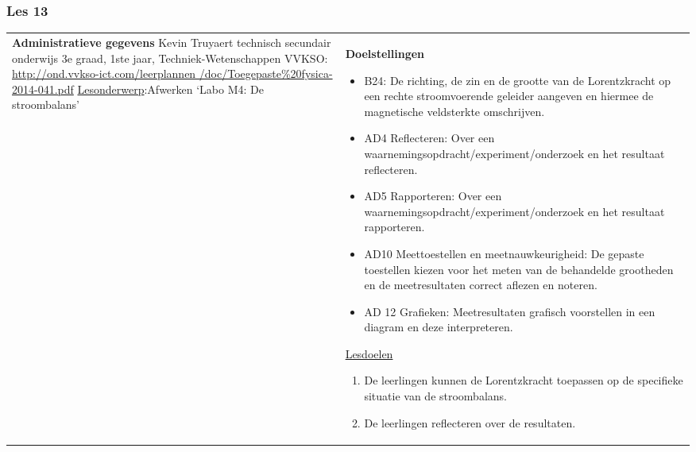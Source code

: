 


\begin{landscape}
	\subsubsection{Les 13}
	\begin{tabularx}{1.56\textwidth}{|p{}|X|}\hline
		\textbf{Administratieve gegevens}\newline\newline
		Kevin Truyaert\newline\newline
		technisch secundair onderwijs\newline
		3e graad, 1ste jaar, Techniek-Wetenschappen\newline
		VVKSO: \href{http://ond.vvkso-ict.com/leerplannen/doc/Toegepaste\%20fysica-2014-041.pdf}{http://ond.vvkso-ict.com/leerplannen /doc/Toegepaste\%20fysica-2014-041.pdf} \newline
		\underline{Lesonderwerp}:\newline Afwerken `Labo M4: De stroombalans' & \textbf{Doelstellingen}
		\begin{itemize}[itemsep=0.08\baselineskip]
			\item B24: De richting, de zin en de grootte van de Lorentzkracht op een rechte stroomvoerende geleider aangeven en hiermee de magnetische veldsterkte omschrijven. 
			\item AD4 Reflecteren: Over een waarnemingsopdracht/experiment/onderzoek en het resultaat reflecteren.
			\item AD5 Rapporteren: Over een waarnemingsopdracht/experiment/onderzoek en het resultaat rapporteren.
			\item AD10 Meettoestellen en meetnauwkeurigheid: De gepaste toestellen kiezen voor het meten van de behandelde grootheden en de meetresultaten correct aflezen en noteren.
			\item AD 12 Grafieken: Meetresultaten grafisch voorstellen in een diagram en deze interpreteren.
		\end{itemize}
		\underline{Lesdoelen}\newline
		\vspace{-0.75cm}
		\begin{enumerate}[itemsep=0.08\baselineskip]
			\item De leerlingen kunnen de Lorentzkracht toepassen op de specifieke situatie van de stroombalans.
			\item De leerlingen reflecteren over de resultaten.

\end{enumerate}
\end{tabularx}
\end{landscape}
